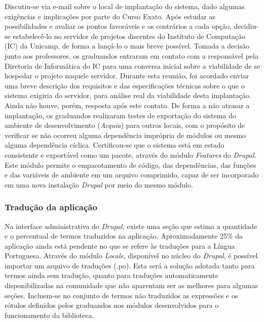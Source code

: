 \documentclass[a4paper]{article}
\begin{document}
Discutiu-se via e-mail sobre o local de implantação do sistema, dado algumas exigências e implicações por parte do Curso Exato. Após estudar as possibilidades e avaliar os pontos favoráveis e os contrários a cada opção, decidiu-se estabelecê-lo no servidor de projetos discentes do Instituto de Computação (IC) da Unicamp, de forma a lançá-lo o mais breve possível.
Tomada a decisão junto aos professores, os graduandos entraram em contato com a responsável pela Diretoria de Informática do IC para uma conversa inicial sobre a viabilidade de se hospedar o projeto naquele servidor. Durante esta reunião, foi acordado enviar uma breve descrição dos requisitos e das especificações técnicas sobre o que o sistema exigiria do servidor, para análise real da viabilidade desta implantação. Ainda não houve, porém, resposta após este contato.
    De forma a não atrasar a implantação, os graduandos realizaram testes de exportação do sistema do ambiente de desenvolvimento (\textit{Acquia}) para outros locais, com o propósito de verificar se não ocorreu alguma dependência imprópria de módulos ou mesmo alguma dependência cíclica. Certificou-se que o sistema está em estado consistente e exportável como um pacote, através do módulo \textit{Features} do \textit{Drupal}. Este módulo permite o empacotamento de código, das dependências, das funções e das variáveis de ambiente em um arquivo comprimido, capaz de ser incorporado em uma nova instalação \textit{Drupal} por meio do mesmo módulo.

\subsubsection{Tradução da aplicação}

Na interface administrativa do \textit{Drupal}, existe uma seção que estima a quantidade e o percentual de termos traduzidos na aplicação. Aproximadamente 25\% da aplicação ainda está pendente no que se refere às traduções para a Língua Portuguesa.
Através do módulo \textit{Locale}, disponível no núcleo do \textit{Drupal}, é possível importar um arquivo de traduções (.po). Esta será a solução adotada tanto para termos ainda sem tradução, quanto para traduções automaticamente disponibilizadas na comunidade que não aparentam ser as melhores para algumas seções. Incluem-se no conjunto de termos não traduzidos as expressões e os rótulos definidos pelos graduandos nos módulos desenvolvidos para o funcionamento da biblioteca.




\end{document}
